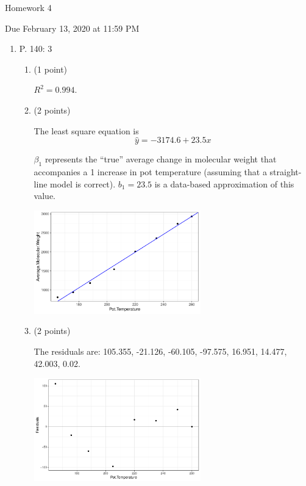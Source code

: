 \documentclass{article}\usepackage[]{graphicx}\usepackage[]{color}
\newenvironment{knitrout}{}{} %
\begin{document}
\begin{center} \LARGE
Homework 4
\end{center}
\begin{center} \Large
Due February 13, 2020 at 11:59 PM 
\end{center}



\begin{enumerate}
	\item P. 140: 3 
	\begin{enumerate}
	\item (1 point)
	


{\color{red} $R^2 = 0.994$.}
\item (2 points)

The least square equation is 
\[\hat{y} = -3174.6 + 23.5 x\]

$\beta_1$ represents the ``true'' average change in molecular weight that accompanies a 1 increase in pot temperature (assuming that a straight-line model is correct). $b_1 = 23.5$ is a data-based approximation of this value.

\begin{knitrout}
\color{fgcolor}

{\centering \includegraphics[width=0.6\textwidth]{figure/unnamed-chunk-3-1} 

}



\end{knitrout}
  \item (2 points)
  
  The residuals are: 105.355, -21.126, -60.105, -97.575, 16.951, 14.477, 42.003, 0.02.
  
\begin{knitrout}
\color{fgcolor}

{\centering \includegraphics[width=0.6\textwidth]{figure/unnamed-chunk-4-1} 

}
\end{knitrout}
\end{enumerate}
\end{enumerate}
\end{document}
